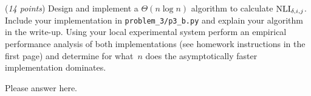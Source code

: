 \documentclass{hw}
\begin{document}
\begin{problem}
        \begin{subproblem}
            (\textit{14 points})
            Design and implement a $\Theta(n\log n)$ algorithm to calculate $\textrm{NLI}_{\delta,i,j}$. Include your implementation in \texttt{problem\_3/p3\_b.py} and explain your algorithm in the write-up. Using your local experimental system perform an empirical performance analysis of both implementations (see homework instructions in the first page) and determine for what~$n$ does the asymptotically faster implementation dominates.
        \end{subproblem}

        \begin{solution}
            Please answer here.
        \end{solution}
\end{problem}

\newpage
\end{document}
